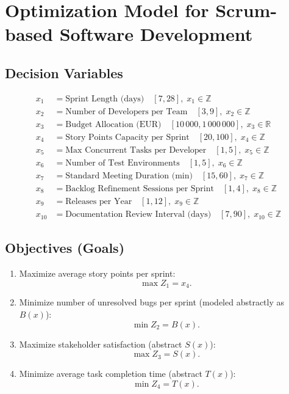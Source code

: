 \documentclass{article}
\begin{document}
\section*{Optimization Model for Scrum-based Software Development}

\subsection*{Decision Variables}
\begin{align*}
x_1 &= \text{Sprint Length (days)} \quad [7,28], \; x_1 \in \mathbb{Z}\\
x_2 &= \text{Number of Developers per Team} \quad [3,9], \; x_2 \in \mathbb{Z}\\
x_3 &= \text{Budget Allocation (EUR)} \quad [10\,000,1\,000\,000], \; x_3 \in \mathbb{R}\\
x_4 &= \text{Story Points Capacity per Sprint} \quad [20,100], \; x_4 \in \mathbb{Z}\\
x_5 &= \text{Max Concurrent Tasks per Developer} \quad [1,5], \; x_5 \in \mathbb{Z}\\
x_6 &= \text{Number of Test Environments} \quad [1,5], \; x_6 \in \mathbb{Z}\\
x_7 &= \text{Standard Meeting Duration (min)} \quad [15,60], \; x_7 \in \mathbb{Z}\\
x_8 &= \text{Backlog Refinement Sessions per Sprint} \quad [1,4], \; x_8 \in \mathbb{Z}\\
x_9 &= \text{Releases per Year} \quad [1,12], \; x_9 \in \mathbb{Z}\\
x_{10} &= \text{Documentation Review Interval (days)} \quad [7,90], \; x_{10} \in \mathbb{Z}
\end{align*}

\subsection*{Objectives (Goals)}
\begin{enumerate}
    \item Maximize average story points per sprint:
    \[ \max Z_1 = x_4. \]
    \item Minimize number of unresolved bugs per sprint (modeled abstractly as $B(x)$):
    \[ \min Z_2 = B(x). \]
    \item Maximize stakeholder satisfaction (abstract $S(x)$):
    \[ \max Z_3 = S(x). \]
    \item Minimize average task completion time (abstract $T(x)$):
    \[ \min Z_4 = T(x). \]
\end{enumerate}
\end{document}
